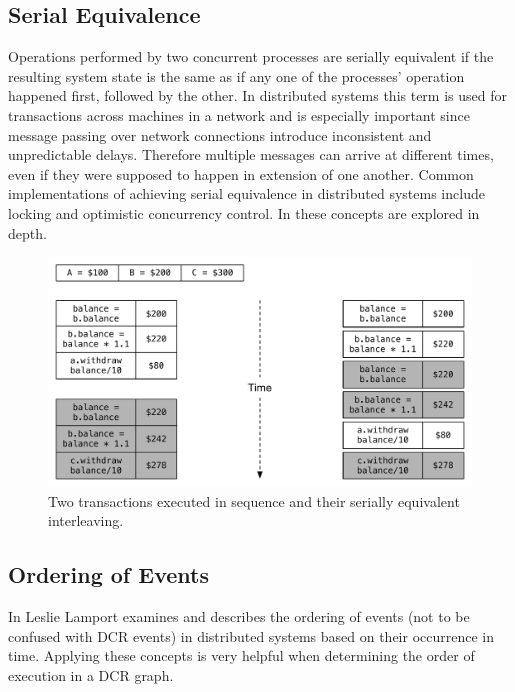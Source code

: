 		\subsection{Serial Equivalence}
		Operations performed by two concurrent processes are serially equivalent if the resulting system state is the same as if any one of the processes' operation happened first, followed by the other. In distributed systems this term is used for transactions across machines in a network and is especially important since message passing over network connections introduce inconsistent and unpredictable delays. Therefore multiple messages can arrive at different times, even if they were supposed to happen in extension of one another. Common implementations of achieving serial equivalence in distributed systems include locking and optimistic concurrency control. In \cite{Coulouris:2011:DSC:2029110:chapter16} these concepts are explored in depth.
		
		\begin{figure}[H]
		\centering
		\includegraphics[width=\textwidth]{2background/images/serial-equivalence.pdf}
		\caption{Two transactions executed in sequence and their serially equivalent interleaving.}
		\label{fig:background:serial-equivalence}
		\end{figure}
		
		\subsection{Ordering of Events}\label{subsec:orderingofevents}
		In \cite{Lamport:1978:TCO:359545.359563} Leslie Lamport examines and describes the ordering of events (not to be confused with DCR events) in distributed systems based on their occurrence in time. Applying these concepts is very helpful when determining the order of execution in a DCR graph. 
		
